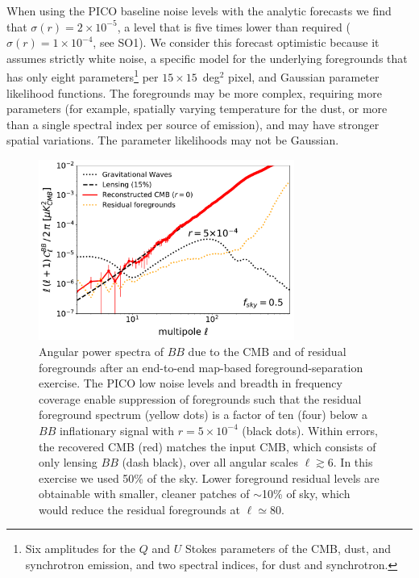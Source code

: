 \documentclass[PICOReport.tex]{subfiles}
\begin{document}
When using the PICO baseline noise levels with the analytic forecasts we find that $\sigma(r) = 2\times 10^{-5}$, a level that is five times lower than required ($\sigma(r) =1 \times 10^{-4}$, see SO1). We consider this forecast optimistic because it assumes strictly white noise, a specific model for the underlying foregrounds that has only eight parameters\footnote{Six amplitudes for the $Q$ and $U$ Stokes parameters of the CMB, dust, and synchrotron emission, and two spectral indices, for dust and synchrotron.} per $15 \times 15$~deg$^{2}$ pixel, and Gaussian parameter likelihood functions. The foregrounds may be more complex, requiring more  parameters (for example, spatially varying temperature for the dust, or more than a single spectral index per source of emission), and may have stronger spatial variations. The parameter likelihoods may not be Gaussian. 
\begin{figure}[h]
\hspace{0.in}
\parbox{3.0in}{\centerline {
\includegraphics[width=3.3in]{images/gnilc_pico_90p92_r0_AL0p15_mc_test3_final.pdf}}}
\hspace{0.2in}
\parbox{3.2in}{
\caption{\captiontext Angular power spectra of $BB$ due to the CMB and of residual foregrounds after an end-to-end map-based foreground-separation exercise. The PICO low noise levels and breadth in frequency coverage enable suppression of foregrounds such that the residual foreground  spectrum  (yellow dots) is a factor of ten (four) below a $BB$ inflationary signal with $r=5\times10^{-4}$ (black dots). Within errors, the recovered CMB (red) matches the input CMB, which consists of only lensing $BB$ (dash black), over all angular scales $\ell \gtrsim 6$. In this exercise we used 50\% of the sky.  Lower foreground residual levels are obtainable with smaller, cleaner patches of $\sim$10\% of sky, which would reduce the residual foregrounds at $\ell \simeq 80$. 
\label{fig:nilc} } }
\vspace{-0.1in}
\end{figure}
\end{document}
